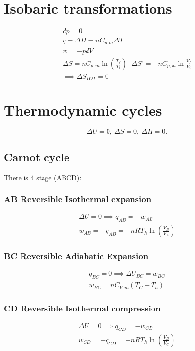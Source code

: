 \documentclass[a4paper]{report}
\begin{document}
\begin{multicols}{2}
      \section{Isobaric transformations}
      

        \begin{gather*}
          dp = 0  \\
          q = \Delta H = nC_{p,m}\Delta T\\
          w = -pdV\\
          \Delta S = n C_{p,m} \ln (\frac{T_f}{T_i}) ~ ~ ~ \Delta S' = -nC_{p,m} \ln \frac{V_{f} }{V_{i}}\\
          \implies \Delta S_{TOT} = 0 
        \end{gather*} 

    \section{Thermodynamic cycles}
    \[
      \Delta U = 0, ~ \Delta S = 0, ~ \Delta H = 0 
    .\] 

      \subsection{Carnot cycle}
      There is 4 stage (ABCD):
        \subsubsection{AB Reversible Isothermal expansion}
        \begin{gather*}
          \Delta U = 0 \implies q_{AB} = -w_{AB}\\
          w_{AB} = -q_{AB} = -nRT_{h}\ln \left(\frac{V_{B}}{V_{A}} \right)
        \end{gather*}

        \subsubsection{BC Reversible Adiabatic Expansion}
        \begin{gather*}
          q_{BC} = 0 \implies \Delta U_{BC} = w_{BC}\\
          w_{BC} = nC_{V,m}(T_{C}-T_{h})  
        \end{gather*}

        \subsubsection{CD Reversible Isothermal compression}
        \begin{gather*}
          \Delta U = 0 \implies q_{CD} = -w_{CD}\\
          w_{CD} = -q_{CD} = -nRT_{h}\ln \left (\frac{V_{D}}{V_{C}} \right )
        \end{gather*}


\end{multicols}
\end{document}
